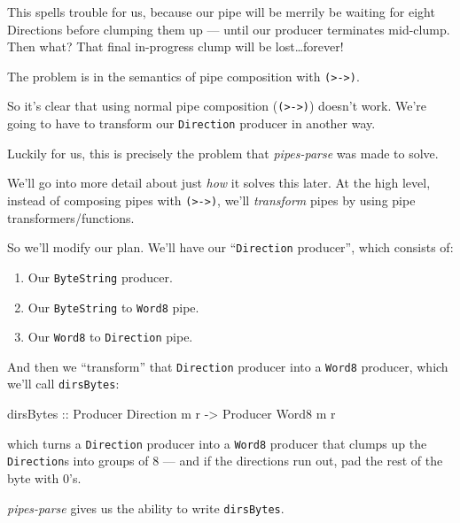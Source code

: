 \documentclass[]{article}
\newenvironment{Shaded}{}{}
\newcommand{\DataTypeTok}[1]{\textcolor[rgb]{0.56,0.13,0.00}{#1}}
\newcommand{\NormalTok}[1]{#1}
\newcommand{\OtherTok}[1]{\textcolor[rgb]{0.00,0.44,0.13}{#1}}
\begin{document}
This spells trouble for us, because our pipe will be merrily be waiting for
eight Directions before clumping them up --- until our producer terminates
mid-clump. Then what? That final in-progress clump will be lost\ldots forever!

The problem is in the semantics of pipe composition with
\texttt{(\textgreater{}-\textgreater{})}.

So it's clear that using normal pipe composition
(\texttt{(\textgreater{}-\textgreater{})}) doesn't work. We're going to have to
transform our \texttt{Direction} producer in another way.

Luckily for us, this is precisely the problem that \emph{pipes-parse} was made
to solve.

We'll go into more detail about just \emph{how} it solves this later. At the
high level, instead of composing pipes with
\texttt{(\textgreater{}-\textgreater{})}, we'll \emph{transform} pipes by using
pipe transformers/functions.

So we'll modify our plan. We'll have our ``\texttt{Direction} producer'', which
consists of:

\begin{enumerate}
\def\labelenumi{\arabic{enumi}.}
\tightlist
\item
  Our \texttt{ByteString} producer.
\item
  Our \texttt{ByteString} to \texttt{Word8} pipe.
\item
  Our \texttt{Word8} to \texttt{Direction} pipe.
\end{enumerate}

And then we ``transform'' that \texttt{Direction} producer into a \texttt{Word8}
producer, which we'll call \texttt{dirsBytes}:

\begin{Shaded}
\begin{Highlighting}[]
\OtherTok{dirsBytes ::} \DataTypeTok{Producer} \DataTypeTok{Direction}\NormalTok{ m r }\OtherTok{{-}\textgreater{}} \DataTypeTok{Producer} \DataTypeTok{Word8}\NormalTok{ m r}
\end{Highlighting}
\end{Shaded}

which turns a \texttt{Direction} producer into a \texttt{Word8} producer that
clumps up the \texttt{Direction}s into groups of 8 --- and if the directions run
out, pad the rest of the byte with 0's.

\emph{pipes-parse} gives us the ability to write \texttt{dirsBytes}.
\end{document}

